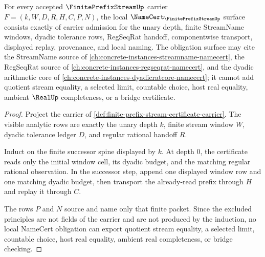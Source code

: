 \begin{theorem}
\label{thm:finite-prefix-stream-certificate-namecert-obligations}
For every accepted $\FinitePrefixStreamUp$ carrier $F=(k,W,D,R,H,C,P,N)$, the local $\NameCert_{\FinitePrefixStreamUp}$ surface consists exactly of carrier admission for the unary depth, finite StreamName windows, dyadic tolerance rows, RegSeqRat handoff, componentwise transport, displayed replay, provenance, and local naming. The obligation surface may cite the StreamName source of \autoref{ch:concrete-instances-streamname-namecert}, the RegSeqRat source of \autoref{ch:concrete-instances-regseqrat-namecert}, and the dyadic arithmetic core of \autoref{ch:concrete-instances-dyadicratcore-namecert}; it cannot add quotient stream equality, a selected limit, countable choice, host real equality, ambient $\RealUp$ completeness, or a bridge certificate.
\end{theorem}
\begin{proof}
Project the carrier of \autoref{def:finite-prefix-stream-certificate-carrier}. The visible analytic rows are exactly the unary depth $k$, finite stream window $W$, dyadic tolerance ledger $D$, and regular rational handoff $R$.

Induct on the finite successor spine displayed by $k$. At depth $0$, the certificate reads only the initial window cell, its dyadic budget, and the matching regular rational observation. In the successor step, append one displayed window row and one matching dyadic budget, then transport the already-read prefix through $H$ and replay it through $C$.

The rows $P$ and $N$ source and name only that finite packet. Since the excluded principles are not fields of the carrier and are not produced by the induction, no local NameCert obligation can export quotient stream equality, a selected limit, countable choice, host real equality, ambient real completeness, or bridge checking.
\end{proof}

